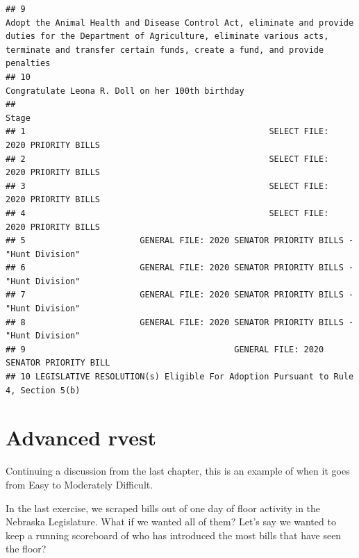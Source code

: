 \documentclass[]{book}
\begin{document}
\begin{verbatim}
## 9                                                                                                                                                                                                                                                  Adopt the Animal Health and Disease Control Act, eliminate and provide duties for the Department of Agriculture, eliminate various acts, terminate and transfer certain funds, create a fund, and provide penalties
## 10                                                                                                                                                                                                                                                                                                                                                                                                                    Congratulate Leona R. Doll on her 100th birthday
##                                                                               Stage
## 1                                                 SELECT FILE:  2020 PRIORITY BILLS
## 2                                                 SELECT FILE:  2020 PRIORITY BILLS
## 3                                                 SELECT FILE:  2020 PRIORITY BILLS
## 4                                                 SELECT FILE:  2020 PRIORITY BILLS
## 5                       GENERAL FILE: 2020 SENATOR PRIORITY BILLS - "Hunt Division"
## 6                       GENERAL FILE: 2020 SENATOR PRIORITY BILLS - "Hunt Division"
## 7                       GENERAL FILE: 2020 SENATOR PRIORITY BILLS - "Hunt Division"
## 8                       GENERAL FILE: 2020 SENATOR PRIORITY BILLS - "Hunt Division"
## 9                                          GENERAL FILE: 2020 SENATOR PRIORITY BILL
## 10 LEGISLATIVE RESOLUTION(s) Eligible For Adoption Pursuant to Rule 4, Section 5(b)
\end{verbatim}

\hypertarget{advanced-rvest}{%
\chapter{Advanced rvest}\label{advanced-rvest}}

Continuing a discussion from the last chapter, this is an example of when it goes from Easy to Moderately Difficult.

In the last exercise, we scraped bills out of one day of floor activity in the Nebraska Legislature. What if we wanted all of them? Let's say we wanted to keep a running scoreboard of who has introduced the most bills that have seen the floor?
\end{document}
